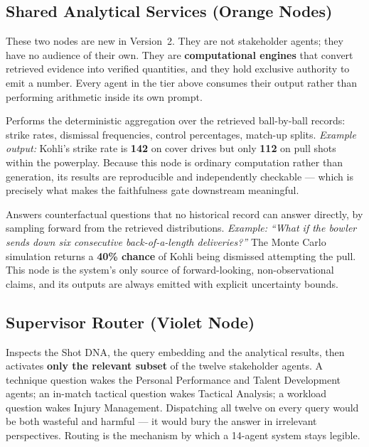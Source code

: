 \documentclass[11pt,a4paper]{article}
\begin{document}
\subsection{Shared Analytical Services (Orange Nodes)}

These two nodes are new in Version~2. They are not stakeholder agents; they have
no audience of their own. They are \textbf{computational engines} that convert
retrieved evidence into verified quantities, and they hold exclusive authority to
emit a number. Every agent in the tier above consumes their output rather than
performing arithmetic inside its own prompt.

\begin{description}[leftmargin=0em,style=nextline]
\item[N8 --- Statistical Analysis Engine.]
  Performs the deterministic aggregation over the retrieved ball-by-ball records:
  strike rates, dismissal frequencies, control percentages, match-up splits.
  \emph{Example output:} Kohli's strike rate is \textbf{142} on cover drives but
  only \textbf{112} on pull shots within the powerplay. Because this node is
  ordinary computation rather than generation, its results are reproducible and
  independently checkable --- which is precisely what makes the faithfulness gate
  downstream meaningful.

\item[N9 --- What-If Simulator (Monte Carlo).]
  Answers counterfactual questions that no historical record can answer directly,
  by sampling forward from the retrieved distributions.
  \emph{Example:} \emph{``What if the bowler sends down six consecutive
  back-of-a-length deliveries?''} The Monte Carlo simulation returns a
  \textbf{40\% chance} of Kohli being dismissed attempting the pull. This node is
  the system's only source of forward-looking, non-observational claims, and its
  outputs are always emitted with explicit uncertainty bounds.
\end{description}

\subsection{Supervisor Router (Violet Node)}

\begin{description}[leftmargin=0em,style=nextline]
\item[N10 --- Supervisor Router (Dynamic Dispatch).]
  Inspects the Shot DNA, the query embedding and the analytical results, then
  activates \textbf{only the relevant subset} of the twelve stakeholder agents.
  A technique question wakes the Personal Performance and Talent Development
  agents; an in-match tactical question wakes Tactical Analysis; a workload
  question wakes Injury Management. Dispatching all twelve on every query would
  be both wasteful and harmful --- it would bury the answer in irrelevant
  perspectives. Routing is the mechanism by which a 14-agent system stays
  legible.
\end{description}
\end{document}
